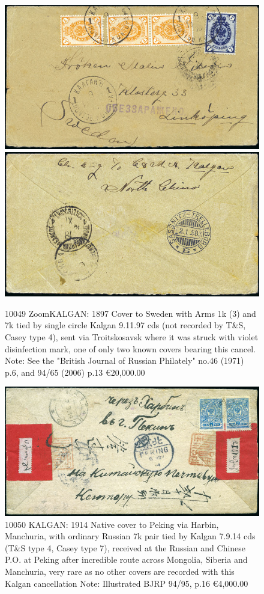 \begin{figure}[htbp]
\centering
\includegraphics[width=.95\textwidth]{../russian-post-offices-in-china/10049.jpg}
\includegraphics[width=.95\textwidth]{../russian-post-offices-in-china/10049-1.jpg}
\caption{
10049		ZoomKALGAN: 1897 Cover to Sweden with Arms 1k (3) and 7k tied
by single circle Kalgan 9.11.97 cds (not recorded by T\&S, Casey type 4), 
sent via Troitskosavsk where it was struck with violet disinfection mark, 
one of only two known covers bearing this cancel.
Note: See the "British Journal of Russian Philately" no.46 (1971) p.6, 
and 94/65 (2006) p.13
\euro 20,000.00 
}  
\end{figure}

\begin{figure}[htbp]
\centering
\includegraphics[width=.95\textwidth]{../russian-post-offices-in-china/10050.jpg}
\caption{
10050	KALGAN: 1914 Native cover to Peking via Harbin, Manchuria, with 
ordinary Russian 7k pair tied by Kalgan 7.9.14 cds (T\&S type 4, Casey type 7), 
received at the Russian and Chinese P.O. at Peking after incredible route across 
Mongolia, Siberia and Manchuria, very rare as no other covers are recorded with 
this Kalgan cancellation
Note: Illustrated BJRP 94/95, p.16
\euro 4,000.00
}  
\end{figure} 

